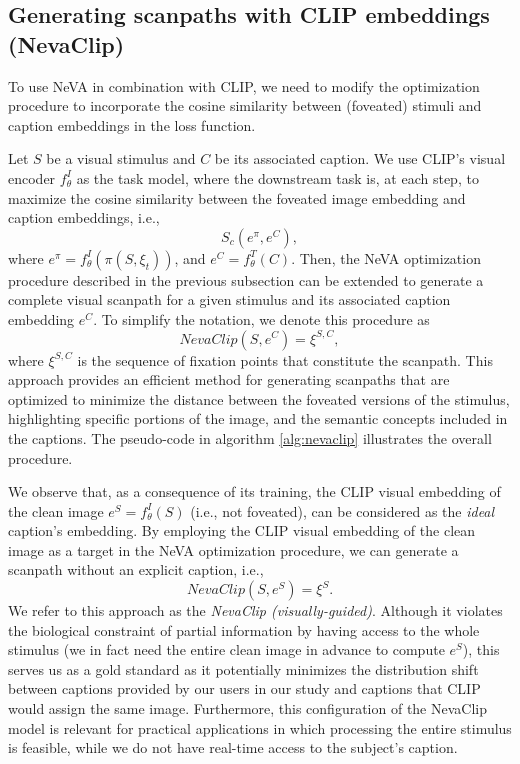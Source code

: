 \documentclass{article}
\begin{document}
\subsection{Generating scanpaths with CLIP embeddings (NevaClip)}
To use NeVA in combination with CLIP, we need to modify the optimization procedure to incorporate the cosine similarity between (foveated) stimuli and caption embeddings in the loss function. 

Let $S$ be a visual stimulus and $C$ be its associated caption. We use CLIP's visual encoder $ f_{\theta}^{I}$ as the task model, where the downstream task is, at each step, to maximize the cosine similarity between the foveated image embedding and caption embeddings, i.e., 
\begin{equation}\label{eq:cosinesim}
    S_c\left(e^{\pi}, e^C\right),
\end{equation}
where $e^{\pi} = f_{\theta}^{I}\left(\pi \left(S, \xi_t \right)\right)$, and $e^C = f_{\theta}^{T}\left(C\right)$.
Then, the NeVA optimization procedure described in the previous subsection can be extended to generate a complete visual scanpath for a given stimulus and its associated caption embedding $e^C$. To simplify the notation, we denote this procedure as 
\begin{equation}
\label{eq:standard}
NevaClip(S, e^C) = \xi^{S,C},
\end{equation}
where $\xi^{S,C}$ is the sequence of fixation points that constitute the scanpath. This approach provides an efficient method for generating scanpaths that are optimized to minimize the distance between the foveated versions of the stimulus, highlighting specific portions of the image, and the semantic concepts included in the captions. The pseudo-code in algorithm \ref{alg:nevaclip} illustrates the overall procedure.

We observe that, as a consequence of its training, the CLIP visual embedding of the clean image $e^S = f_{\theta}^{I}\left( S \right)$ (i.e., not foveated), can be considered as the \textit{ideal} caption's embedding. By employing the CLIP visual embedding of the clean image as a target in the NeVA optimization procedure, we can generate a scanpath without an explicit caption, i.e., 
\begin{equation}
\label{eq:fullyvisual}
    NevaClip(S, e^S) =  \xi^S.
\end{equation}
We refer to this approach as the  \textit{NevaClip (\textit{visually-guided})}. Although it violates the biological constraint of partial information by having access to the whole stimulus (we in fact need the entire clean image in advance to compute $e^S$), this serves us as a gold standard as it potentially minimizes the distribution shift between captions provided by our users in our study and captions that CLIP would assign the same image. Furthermore, this configuration of the NevaClip model is relevant for practical applications in which processing the entire stimulus is feasible, while we do not have real-time access to the subject's caption.
\end{document}
